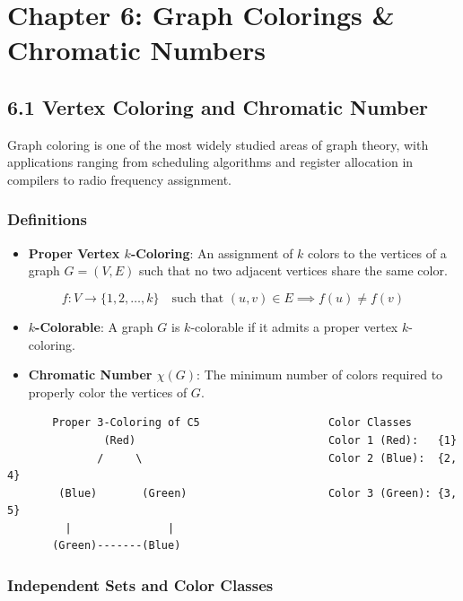 \documentclass[
]{book}
\providecommand{\tightlist}{%
  \setlength{\itemsep}{0pt}\setlength{\parskip}{0pt}}
\theoremstyle{definition}
\theoremstyle{definition}
\theoremstyle{definition}
\theoremstyle{definition}
\theoremstyle{remark}
\begin{document}
\chapter{Chapter 6: Graph Colorings \& Chromatic Numbers}\label{chapter-6-graph-colorings-chromatic-numbers}

\section{6.1 Vertex Coloring and Chromatic Number}\label{vertex-coloring-and-chromatic-number}

Graph coloring is one of the most widely studied areas of graph theory, with applications ranging from scheduling algorithms and register allocation in compilers to radio frequency assignment.

\subsection{Definitions}\label{definitions-3}

\begin{itemize}
\tightlist
\item
  \textbf{Proper Vertex \(k\)-Coloring}: An assignment of \(k\) colors to the vertices of a graph \(G = (V, E)\) such that no two adjacent vertices share the same color.
\end{itemize}

\[f: V \to \{1, 2, \dots, k\} \quad \text{such that } (u, v) \in E \implies f(u) \neq f(v)\]

\begin{itemize}
\tightlist
\item
  \textbf{\(k\)-Colorable}: A graph \(G\) is \(k\)-colorable if it admits a proper vertex \(k\)-coloring.
\item
  \textbf{Chromatic Number \(\chi(G)\)}: The minimum number of colors required to properly color the vertices of \(G\).
\end{itemize}

\begin{verbatim}
       Proper 3-Coloring of C5                    Color Classes
               (Red)                              Color 1 (Red):   {1}
              /     \                             Color 2 (Blue):  {2, 4}
        (Blue)       (Green)                      Color 3 (Green): {3, 5}
         |               |
       (Green)-------(Blue)
\end{verbatim}

\subsection{Independent Sets and Color Classes}\label{independent-sets-and-color-classes}
\end{document}
